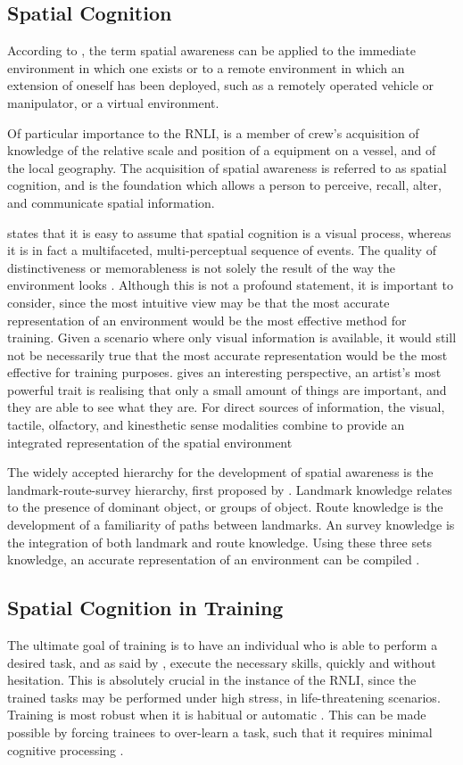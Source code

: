 \documentclass[a4paper, openright, twoside]{report}
\begin{document}
\subsection{Spatial Cognition}
According to \cite{stone}, the term spatial awareness can be applied to the immediate environment in which one exists or to a remote environment in which an extension of oneself has been deployed, such as a remotely operated vehicle or manipulator, or a virtual environment. 

Of particular importance to the RNLI, is a member of crew's acquisition of knowledge of the relative scale and position  of a  equipment on a vessel, and of the local geography. The acquisition of spatial awareness is referred to as spatial cognition, and is the foundation which allows a person to perceive, recall, alter, and communicate spatial information. 

 \cite{osberg} states that it is easy to assume that spatial cognition is a visual process, whereas it is in fact a multifaceted, multi-perceptual sequence of events.  The quality of distinctiveness or memorableness is not solely the result of the way the environment looks \citep{downs}. Although this is not a profound statement, it is important to consider, since the most intuitive view may be that the most accurate representation of an environment would be the most effective method for training. Given a scenario where only visual information is available, it would still not be necessarily true that the most accurate representation would be the most effective for training purposes. \cite{gleick} gives an interesting perspective, an artist's most powerful trait is realising that only a small amount of things are important, and they are able to see what they are. For direct sources of information, the visual, tactile, olfactory, and kinesthetic sense modalities combine to provide an integrated representation of the spatial environment  \citep{downs}

The widely accepted hierarchy for the development of spatial awareness is the landmark-route-survey hierarchy, first proposed by \cite{siegel}.  Landmark knowledge relates to the presence of dominant object, or groups of object. Route knowledge is the development of a familiarity of paths between landmarks. An survey knowledge is the integration of both landmark and route knowledge. Using these three sets knowledge, an accurate representation of an environment can be compiled \citep{stone}.  

\subsection{Spatial Cognition in Training}
The ultimate goal of training is to have an individual who is able to perform a desired task, and as said by \cite{hussein}, execute the necessary skills, quickly and without hesitation. This is absolutely crucial in the instance of the RNLI, since the trained tasks may be performed under high stress, in life-threatening scenarios. Training is most robust when it is habitual or automatic \citep{hussein}. This can be made possible by forcing trainees to over-learn a task, such that it requires minimal cognitive processing  \citep{kirlik}. 
\end{document}
